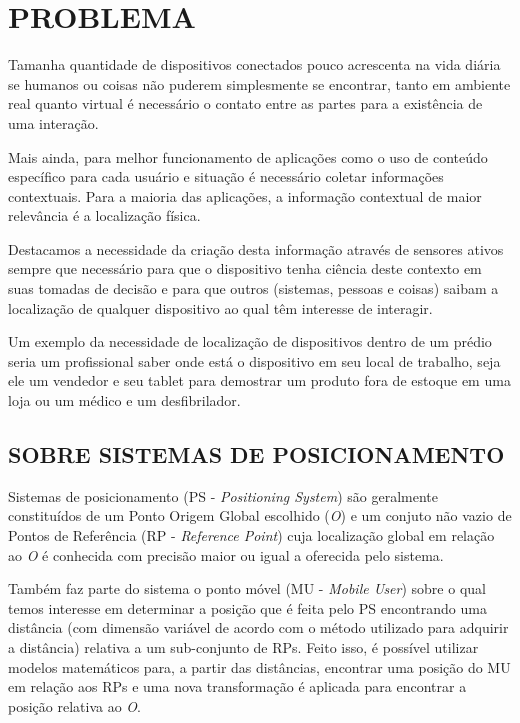 \chapter{PROBLEMA}
\label{chap:PROBLEMA}

Tamanha quantidade de dispositivos conectados pouco acrescenta na vida diária se
humanos ou coisas não puderem simplesmente se encontrar, tanto em ambiente real
quanto virtual é necessário o contato entre as partes para a existência de uma
interação.

Mais ainda, para melhor funcionamento de aplicações como o uso de conteúdo
específico para cada usuário e situação é necessário coletar informações
contextuais. Para a maioria das aplicações, a informação contextual de maior
relevância é a localização física.

Destacamos a necessidade da criação desta informação através de sensores ativos
sempre que necessário para que o dispositivo tenha ciência deste contexto em
suas tomadas de decisão e para que outros (sistemas, pessoas e coisas) saibam a
localização de qualquer dispositivo ao qual têm interesse de interagir.

Um exemplo da necessidade de localização de dispositivos dentro de um prédio
seria um profissional saber onde está o dispositivo em seu local de trabalho,
seja ele um vendedor e seu tablet para demostrar um produto fora de estoque em
uma loja ou um médico e um desfibrilador.

\section{SOBRE SISTEMAS DE POSICIONAMENTO}
\label{sec:SOBRE SISTEMAS DE POSICIONAMENTO}

Sistemas de posicionamento (PS - \textit{Positioning System}) são geralmente
constituídos de um Ponto Origem Global escolhido (\textit{O}) e um conjuto não
vazio de Pontos de Referência (RP - \textit{Reference Point}) cuja localização
global em relação ao \textit{O} é conhecida com precisão maior ou igual a
oferecida pelo sistema.

Também faz parte do sistema o ponto móvel (MU - \textit{Mobile User}) sobre o
qual temos interesse em determinar a posição que é feita pelo PS encontrando uma
distância (com dimensão variável de acordo com o método utilizado para
adquirir a distância) relativa a um sub-conjunto de RPs. Feito isso, é possível utilizar
modelos matemáticos para, a partir das distâncias, encontrar uma posição do MU
em relação aos RPs e uma nova transformação é aplicada para encontrar a posição
relativa ao \textit{O}.

